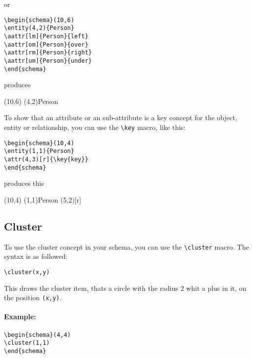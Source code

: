 \documentclass[a4paper,11pt]{article}
\begin{document}
or

\begin{verbatim}
\begin{schema}(10,6)
\entity(4,2){Person}
\aattr[lm]{Person}{left}
\aattr[om]{Person}{over}
\aattr[rm]{Person}{right}
\aattr[um]{Person}{under}
\end{schema}
\end{verbatim}

produces

\begin{schema}(10,6)
\entity(4,2){Person}
\end{schema}

To show that an attribute or an sub-attribute is a key concept for the object, entity or relationship,
you can use the \verb|\key| macro, like this:

\begin{verbatim}
\begin{schema}(10,4)
\entity(1,1){Person}
\attr(4,3)[r]{\key{key}}
\end{schema}
\end{verbatim}

produces this

\begin{schema}(10,4)
\entity(1,1){Person}
\attr(5,2)[r]{}
\end{schema}

\subsection{Cluster}

To use the cluster concept in your schema, you can use the \verb|\cluster| macro.
The syntax is as followed:

\begin{verbatim}
\cluster(x,y)
\end{verbatim}

This draws the cluster item, thats a circle with the radius 2 whit a plus in it, on the position 
{\tt (x,y)}.

\paragraph{Example:}

\begin{verbatim}
\begin{schema}(4,4)
\cluster(1,1)
\end{schema}

\end{verbatim}
\end{document}
